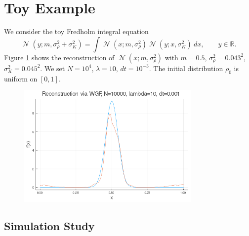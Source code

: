 \documentclass[a4paper]{article}
\theoremstyle{definition}
\DeclareMathOperator{\N}{\mathcal{N}}
\begin{document}
\section{Toy Example}

We consider the toy Fredholm integral equation
\begin{equation*}
\N(y; m, \sigma_{\rho}^2 + \sigma_K^2) = \int \N(x; m, \sigma_{\rho}^2)\N(y; x, \sigma_K^2)\ dx,\qquad y\in\mathbb{R}.
\end{equation*}
Figure \ref{fig:at} shows the reconstruction of $\N(x; m, \sigma_{\rho}^2)$ with $m=0.5$, $\sigma_{\rho}^2 = 0.043^2$, $\sigma_K^2 = 0.045^2$.
We set $N=10^{4}$, $\lambda = 10$, $dt = 10^{-3}$. The initial distribution $\rho_0$ is uniform on $[0, 1]$.

\begin{figure}
\centering
\includegraphics[width = 0.8\textwidth]{analitically_tractable}
\caption{ }
\label{fig:at}
\end{figure}

\subsection{Simulation Study}
\end{document}
